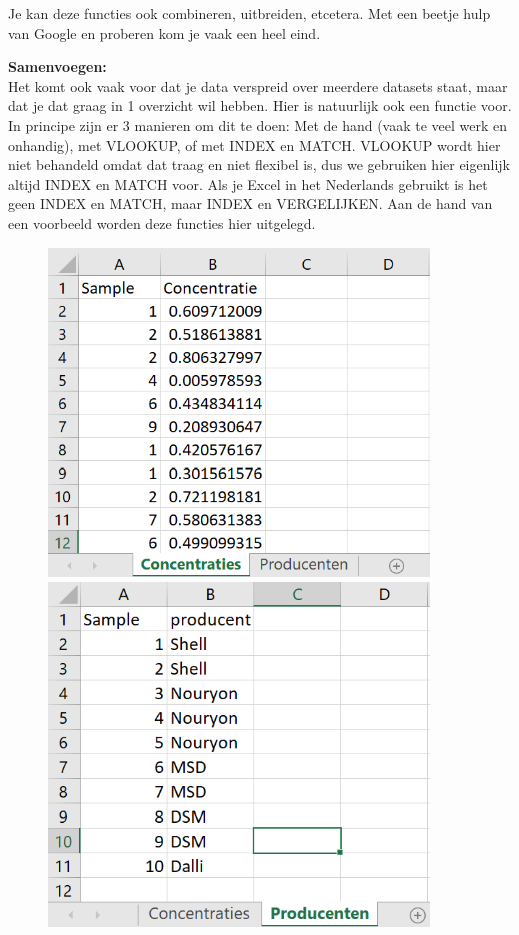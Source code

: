 Je kan deze functies ook combineren, uitbreiden, etcetera. Met een beetje hulp van Google en proberen kom je vaak een heel eind. 

\textbf{Samenvoegen:}\\
Het komt ook vaak voor dat je data verspreid over meerdere datasets staat, maar dat je dat graag in 1 overzicht wil hebben. Hier is natuurlijk ook een functie voor. In principe zijn er 3 manieren om dit te doen: Met de hand (vaak te veel werk en onhandig), met VLOOKUP, of met INDEX en MATCH. VLOOKUP wordt hier niet behandeld omdat dat traag en niet flexibel is, dus we gebruiken hier eigenlijk altijd INDEX en MATCH voor. Als je Excel in het Nederlands gebruikt is het geen INDEX en MATCH, maar INDEX en VERGELIJKEN. Aan de hand van een voorbeeld worden deze functies hier uitgelegd.


\begin{figure}[h]
    \centering
    \begin{minipage}{0.45\textwidth}
        \centering
        \includegraphics[width=0.9\textwidth]{img/index1.png} 
    \end{minipage}\hfill
    \begin{minipage}{0.45\textwidth}
        \centering
        \includegraphics[width=0.9\textwidth]{img/index2.png}

\end{minipage}
\end{figure}
